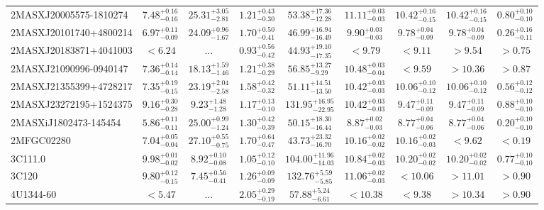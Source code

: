 \documentclass[onecolumn]{mn2e}
\begin{document}
{\begin{center}
\begin{longtable}{lcccccccc}
2MASXJ20005575-1810274 & $7.48_{-0.16}^{+0.16}$ & $25.31_{-2.81}^{+3.05}$ & $1.21_{-0.30}^{+0.43}$ &$53.38_{-12.28}^{+17.36}$ & $11.11_{-0.03}^{+0.03}$ & $10.42_{-0.15}^{+0.16}$ & $10.42_{-0.15}^{+0.16}$ & $0.80_{-0.10}^{+0.10}$ \\
2MASXJ20101740+4800214 & $6.97_{-0.09}^{+0.11}$ & $24.09_{-1.67}^{+0.96}$ & $1.70_{-0.41}^{+0.50}$ &$46.99_{-16.49}^{+16.94}$ & $9.90_{-0.03}^{+0.03}$ & $9.78_{-0.09}^{+0.04}$ & $9.78_{-0.09}^{+0.04}$ & $0.26_{-0.11}^{+0.16}$ \\
2MASXJ20183871+4041003 & $<6.24$ & ... & $0.93_{-0.42}^{+0.56}$ &$44.93_{-17.35}^{+19.10}$ & $<9.79$ & $<9.11$ & $>9.54$ & $>0.75$ \\
2MASXJ21090996-0940147 & $7.36_{-0.14}^{+0.14}$ & $18.13_{-1.46}^{+1.59}$ & $1.21_{-0.29}^{+0.38}$ &$56.85_{-9.29}^{+13.27}$ & $10.48_{-0.04}^{+0.03}$ & $<9.59$ & $>10.36$ & $>0.87$ \\
2MASXJ21355399+4728217 & $7.35_{-0.15}^{+0.19}$ & $23.19_{-2.58}^{+2.04}$ & $1.58_{-0.32}^{+0.42}$ &$51.11_{-13.50}^{+14.51}$ & $10.42_{-0.03}^{+0.03}$ & $10.06_{-0.12}^{+0.10}$ & $10.06_{-0.12}^{+0.10}$ & $0.56_{-0.12}^{+0.12}$ \\
2MASXJ23272195+1524375 & $9.16_{-0.28}^{+0.30}$ & $9.23_{-1.28}^{+1.48}$ & $1.17_{-0.10}^{+0.13}$ &$131.95_{-22.95}^{+16.95}$ & $10.42_{-0.03}^{+0.03}$ & $9.47_{-0.09}^{+0.11}$ & $9.47_{-0.09}^{+0.11}$ & $0.88_{-0.10}^{+0.10}$ \\
2MASXiJ1802473-145454 & $5.86_{-0.11}^{+0.11}$ & $25.00_{-1.24}^{+0.99}$ & $1.30_{-0.39}^{+0.42}$ &$50.15_{-16.44}^{+18.30}$ & $8.87_{-0.03}^{+0.02}$ & $8.77_{-0.06}^{+0.04}$ & $8.77_{-0.06}^{+0.04}$ & $0.20_{-0.10}^{+0.10}$ \\
2MFGC02280 & $7.04_{-0.04}^{+0.05}$ & $27.10_{-0.75}^{+0.55}$ & $1.70_{-0.47}^{+0.64}$ &$43.73_{-16.70}^{+23.32}$ & $10.16_{-0.02}^{+0.02}$ & $10.16_{-0.03}^{+0.02}$ & $<9.62$ & $<0.19$ \\
3C111.0 & $9.98_{-0.02}^{+0.01}$ & $8.92_{-0.08}^{+0.10}$ & $1.05_{-0.10}^{+0.12}$ &$104.00_{-14.03}^{+11.96}$ & $10.84_{-0.03}^{+0.02}$ & $10.20_{-0.02}^{+0.02}$ & $10.20_{-0.02}^{+0.02}$ & $0.77_{-0.10}^{+0.10}$ \\
3C120 & $9.80_{-0.15}^{+0.12}$ & $7.45_{-0.41}^{+0.56}$ & $1.26_{-0.09}^{+0.09}$ &$132.76_{-5.85}^{+5.59}$ & $11.06_{-0.03}^{+0.02}$ & $<10.06$ & $>11.01$ & $>0.90$ \\
4U1344-60 & $<5.47$ & ... & $2.05_{-0.19}^{+0.29}$ &$57.88_{-6.61}^{+5.24}$ & $<10.38$ & $<9.38$ & $>10.34$ & $>0.90$ \\

\end{longtable}
\end{center}}
\end{document}
